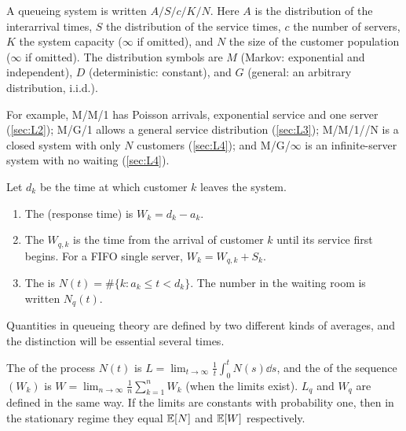 \begin{definition}\label{L1:def:kendall}
A queueing system is written $A/S/c/K/N$. Here $A$ is the distribution of the
interarrival times, $S$ the distribution of the service times, $c$ the number of
servers, $K$ the system capacity ($\infty$ if omitted), and $N$ the size of the
customer population ($\infty$ if omitted). The distribution symbols are $M$ (Markov:
exponential and independent), $D$ (deterministic: constant), and $G$ (general:
an arbitrary distribution, i.i.d.).
\end{definition}

For example, M/M/1 has Poisson arrivals, exponential service and one server
(\cref{sec:L2}); M/G/1 allows a general service distribution (\cref{sec:L3});
M/M/1//N is a closed system with only $N$ customers (\cref{sec:L4}); and
M/G/$\infty$ is an infinite-server system with no waiting (\cref{sec:L4}).

\begin{definition}\label{L1:def:measures}
Let $d_k$ be the time at which customer $k$ leaves the system.
\begin{enumerate}
\item The  (response time) is $W_k=d_k-a_k$.
\item The  $W_{q,k}$ is the time from the arrival of customer $k$
  until its service first begins. For a FIFO single server, $W_k=W_{q,k}+S_k$.
\item The  is $N(t)=\#\{k: a_k\le t<d_k\}$. The number in the
  waiting room is written $N_q(t)$.
\end{enumerate}
\end{definition}

Quantities in queueing theory are defined by two different kinds of averages, and the
distinction will be essential several times.

\begin{definition}\label{L1:def:averages}
The  of the process $N(t)$ is
$L=\lim_{t\to\infty}\frac1t\int_0^t N(s)\dd s$, and the  of the
sequence $(W_k)$ is $W=\lim_{n\to\infty}\frac1n\sum_{k=1}^n W_k$ (when the limits
exist). $L_q$ and $W_q$ are defined in the same way. If the limits are constants with
probability one, then in the stationary regime they equal $\mathbb{E}[N]$ and $\mathbb{E}[W]$
respectively.
\end{definition}

